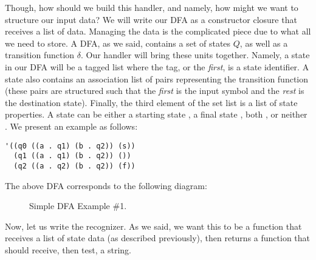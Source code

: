 Though, how should we build this handler, and namely, how might we want to structure our input data? We will write our DFA as a constructor closure that receives a list of data. Managing the data is the complicated piece due to what all we need to store. A DFA, as we said, contains a set of states $Q$, as well as a transition function $\delta$. Our handler will bring these units together. Namely, a state in our DFA will be a tagged list where the tag, or the \textit{first}, is a state identifier. A state also contains an association list of pairs representing the transition function (these pairs are structured such that the \textit{first} is the input symbol and the \textit{rest} is the destination state). Finally, the third element of the set list is a list of state properties. A state can be either a starting state , a final state , both , or neither \ttt{()}. We present an example as follows:

\begin{cl}[]{}\begin{lstlisting}[language=MYNLNScheme]
'((q0 ((a . q1) (b . q2)) (s))
  (q1 ((a . q1) (b . q2)) ())
  (q2 ((a . q2) (b . q2)) (f))
\end{lstlisting}\end{cl}

\noindent The above DFA corresponds to the following diagram:

\begin{figure}[H]
\begin{center}
\end{center}
\caption{Simple DFA Example \#1.}
\label{fig:dfanest1}
\end{figure}

Now, let us write the recognizer. As we said, we want this to be a function that receives a list of state data (as described previously), then returns a function that should receive, then test, a string.

